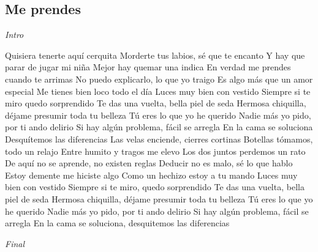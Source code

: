 \subsection{Me prendes}
\noindent

\vspace{1cm}

\begin{guitar}
	\begin{multicols}{2}
		\par
		\textit{Intro}

		Quisiera tenerte aquí cerquita
		Morderte tus labios, sé que te encanto
		Y hay que parar de jugar mi niña
		Mejor hay quemar una indica
		En verdad me prendes cuando te arrimas
		No puedo explicarlo, lo que yo traigo
		Es algo más que un amor especial
		Me tienes bien loco todo el día
		Luces muy bien con vestido
		Siempre si te miro quedo sorprendido
		Te das una vuelta, bella piel de seda
		Hermosa chiquilla, déjame presumir toda tu belleza
		Tú eres lo que yo he querido
		Nadie más yo pido, por ti ando delirio
		Si hay algún problema, fácil se arregla
		En la cama se soluciona
		Desquítemos las diferencias
		Las velas enciende, cierres cortinas
		Botellas tómamos, todo un relajo
		Entre humito y tragos me elevo
		Los dos juntos perdemos un rato
		De aquí no se aprende, no existen reglas
		Deducir no es malo, sé lo que hablo
		Estoy demente me hiciste algo
		Como un hechizo estoy a tu mando
		Luces muy bien con vestido
		Siempre si te miro, quedo sorprendido
		Te das una vuelta, bella piel de seda
		Hermosa chiquilla, déjame presumir toda tu belleza
		Tú eres lo que yo he querido
		Nadie más yo pido, por ti ando delirio
		Si hay algún problema, fácil se arregla
		En la cama se soluciona, desquitemos las diferencias

\par
\textit{Final}
	\end{multicols}
\end{guitar}
